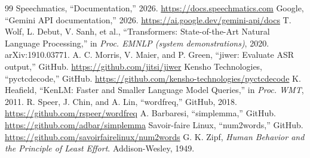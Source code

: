 \documentclass[conference]{IEEEtran}
\begin{document}
\begin{thebibliography}{99}
 Speechmatics, ``Documentation,'' 2026. \url{https://docs.speechmatics.com}
 Google, ``Gemini API documentation,'' 2026. \url{https://ai.google.dev/gemini-api/docs}
 T. Wolf, L. Debut, V. Sanh, et al., ``Transformers: State-of-the-Art Natural Language Processing,'' in \emph{Proc. EMNLP (system demonstrations)}, 2020. arXiv:1910.03771.
 A. C. Morris, V. Maier, and P. Green, ``jiwer: Evaluate ASR output,'' GitHub. \url{https://github.com/jitsi/jiwer}
 Kensho Technologies, ``pyctcdecode,'' GitHub. \url{https://github.com/kensho-technologies/pyctcdecode}
 K. Heafield, ``KenLM: Faster and Smaller Language Model Queries,'' in \emph{Proc. WMT}, 2011.
 R. Speer, J. Chin, and A. Lin, ``wordfreq,'' GitHub, 2018. \url{https://github.com/rspeer/wordfreq}
 A. Barbaresi, ``simplemma,'' GitHub. \url{https://github.com/adbar/simplemma}
 Savoir-faire Linux, ``num2words,'' GitHub. \url{https://github.com/savoirfairelinux/num2words}
 G. K. Zipf, \emph{Human Behavior and the Principle of Least Effort}. Addison-Wesley, 1949.
\end{thebibliography}
\end{document}
